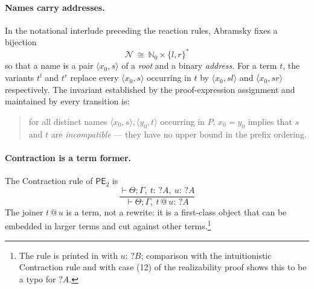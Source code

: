\documentclass[11pt]{article}
\theoremstyle{definition}
\theoremstyle{plain}
\theoremstyle{remark}
\begin{document}
\paragraph{Names carry addresses.}
In the notational interlude preceding the reaction rules, Abramsky fixes
a bijection
\[
  \mathcal{N} \ \cong\ \mathbb{N}_0 \times \{l,r\}^*
\]
so that a name is a pair $\langle x_0, s\rangle$ of a \emph{root} and a
binary \emph{address}. For a term $t$, the variants $t^l$ and $t^r$
replace every $\langle x_0, s\rangle$ occurring in $t$ by
$\langle x_0, sl\rangle$ and $\langle x_0, sr\rangle$ respectively. The
invariant established by the proof-expression assignment and maintained by
every transition is:
\begin{quote}
for all distinct names $\langle x_0,s\rangle, \langle y_0,t\rangle$
occurring in $P$, $x_0 = y_0$ implies that $s$ and $t$ are
\emph{incompatible} --- they have no upper bound in the prefix ordering.
\end{quote}

\paragraph{Contraction is a term former.}
The Contraction rule of $\mathsf{PE}_2$ is
\[
\frac{\vdash \Theta; \Gamma,\ t{:}\,?A,\ u{:}\,?A}
     {\vdash \Theta; \Gamma,\ t \mathbin{@} u : \,?A}
\]
The joiner $t \mathbin{@} u$ is a term, not a rewrite: it is a
first-class object that can be embedded in larger terms and cut against
other terms.\footnote{The rule is printed in \cite{Abramsky93} with
$u{:}\,?B$; comparison with the intuitionistic Contraction rule and with
case (12) of the realizability proof shows this to be a typo for $?A$.}
\end{document}
